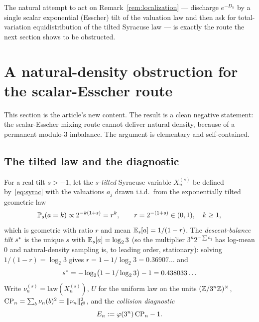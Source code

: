 \documentclass[11pt]{amsart}
\theoremstyle{definition}
\theoremstyle{remark}
\begin{document}
The natural attempt to act on Remark~\ref{rem:localization} --- discharge $e^{-D_n}$ by a single scalar
exponential (Esscher) tilt of the valuation law and then ask for total-variation equidistribution of the
tilted Syracuse law --- is exactly the route the next section shows to be obstructed.

\section{A natural-density obstruction for the scalar-Esscher route}
\label{sec:obstruction}

This section is the article's new content. The result is a clean negative statement: the scalar-Esscher
mixing route cannot deliver natural density, because of a permanent modulo-$3$ imbalance. The argument is
elementary and self-contained.

\subsection{The tilted law and the diagnostic}
For a real tilt $s>-1$, let the \emph{$s$-tilted} Syracuse variable $X_n^{(s)}$ be defined
by~\eqref{eq:syrac} with the valuations $a_j$ drawn i.i.d.\ from the exponentially tilted geometric law
\begin{equation}
   \mathbb{P}_s(a=k)\propto 2^{-k(1+s)}=r^k,\qquad r=2^{-(1+s)}\in(0,1),\quad k\ge1,
   \label{eq:tilt}
\end{equation}
which is geometric with ratio $r$ and mean $\mathbb{E}_s[a]=1/(1-r)$. The \emph{descent-balance tilt} $s^{*}$
is the unique $s$ with $\mathbb{E}_s[a]=\log_2 3$ (so the multiplier $3^n 2^{-\sum a_j}$ has log-mean $0$ and
natural-density sampling is, to leading order, stationary): solving $1/(1-r)=\log_2 3$ gives
$r=1-1/\log_2 3=0.36907\ldots$ and
\begin{equation}
   s^{*}=-\log_2\!\big(1-1/\log_2 3\big)-1=0.438033\ldots
   \label{eq:sstar}
\end{equation}
Write $\nu_n^{(s)}=\mathrm{law}(X_n^{(s)})$, $U$ for the uniform law on the units $(\mathbb{Z}/3^{n}\mathbb{Z})^{\times}$,
$\mathrm{CP}_n=\sum_b\nu_n(b)^2=\|\nu_n\|_{\ell^2}^2$, and the \emph{collision diagnostic}
\begin{equation}
   E_n:=\varphi(3^n)\,\mathrm{CP}_n-1.
   \label{eq:Endef}
\end{equation}
\end{document}
